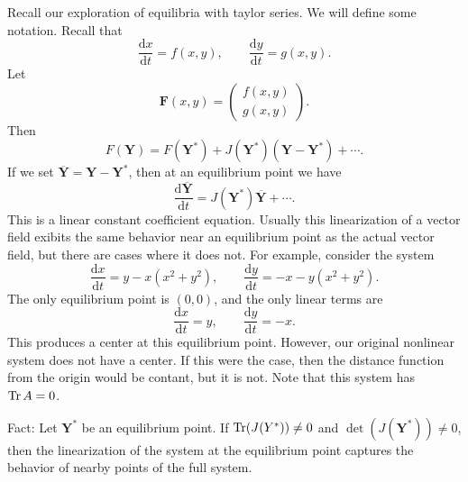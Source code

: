 Recall our exploration of equilibria with taylor series. We will define some notation. Recall that
\[
	\frac{\mathrm{d}x}{\mathrm{d}t} =f(x,y),\qquad \frac{\mathrm{d}y}{\mathrm{d}t} =g(x,y)
.\]
Let
\[
	\mathbf{F}(x,y)=\begin{pmatrix}
		f(x,y)\\
		g(x,y)
	\end{pmatrix} 
.\]
Then
\[
	F(\mathbf{Y})=F(\mathbf{Y}^*)+J(\mathbf{Y}^*)(\mathbf{Y}-\mathbf{Y}^*)+\cdots
.\]
If we set $\overline{\mathbf{Y}}=\mathbf{Y}-\mathbf{Y}^*$, then at an equilibrium point we have
\[
\frac{\mathrm{d}\overline{\mathbf{Y}}}{\mathrm{d}t} = J(\mathbf{Y}^*)\overline{\mathbf{Y}} +\cdots
.\]
This is a linear constant coefficient equation. Usually this linearization of a vector field exibits the same behavior near an equilibrium point as the actual vector field, but there are cases where it does not. For example, consider the system
\[
	\frac{\mathrm{d}x}{\mathrm{d}t} =y-x\left( x^2+y^2 \right) ,\qquad \frac{\mathrm{d}y}{\mathrm{d}t} =-x-y\left( x^2+y^2 \right) 
.\]
The only equilibrium point is $(0,0)$, and the only linear terms are
\[
	\frac{\mathrm{d}x}{\mathrm{d}t} =y,\qquad \frac{\mathrm{d}y}{\mathrm{d}t} =-x
.\]
This produces a center at this equilibrium point. However, our original nonlinear system does not have a center. If this were the case, then the distance function from the origin would be contant, but it is not. Note that this system has $\operatorname{Tr} A=0$.

Fact: Let $\mathbf{Y}^*$ be an equilibrium point. If $\operatorname{Tr} (J(Y^*))\neq 0$ and $\det (J(\mathbf{Y}^*))\neq 0$, then the linearization of the system at the equilibrium point captures the behavior of nearby points of the full system.

